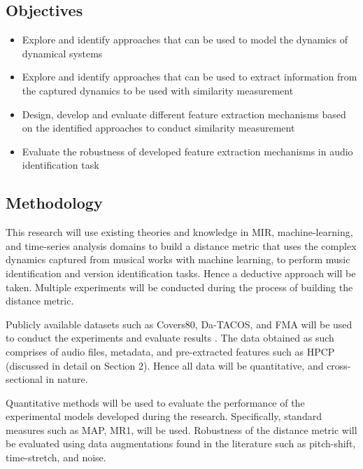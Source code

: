 \documentclass[../main.tex]{subfiles}
\begin{document}
\newpage
\subsection{Objectives}
\begin{itemize}
  \item Explore and identify approaches that can be used to model the dynamics of dynamical systems
  \item Explore and identify approaches that can be used to extract information from the captured dynamics to be used with similarity measurement
  \item Design, develop and evaluate different feature extraction mechanisms based on the identified approaches to conduct similarity measurement
  \item Evaluate the robustness of developed feature extraction mechanisms in audio identification task
\end{itemize}



\subsection{Methodology}

\par
This research will use existing theories and knowledge in \gls{MIR}, machine-learning, and time-series analysis domains to build a distance metric that uses the complex dynamics captured from musical works with machine learning, to perform music identification and version identification tasks. Hence a deductive approach will be taken. Multiple experiments will be conducted during the process of building the distance metric.

\par
Publicly available datasets such as Covers80, Da-TACOS, and FMA will be used to conduct the experiments and evaluate results \cite{Covers80CoverSong,yesilerDaTACOSDatasetCover2019,defferrardFMADatasetMusic2017}. The data obtained as such comprises of audio files, metadata, and pre-extracted features such as \gls{HPCP} (discussed in detail on Section 2). Hence all data will be quantitative, and cross-sectional in nature.

\par
Quantitative methods will be used to evaluate the performance of the experimental models developed during the research. Specifically, standard measures such as \gls{MAP}, \gls{MR1}, will be used. Robustness of the distance metric will be evaluated using data augmentations found in the literature such as pitch-shift, time-stretch, and noise.
\end{document}
